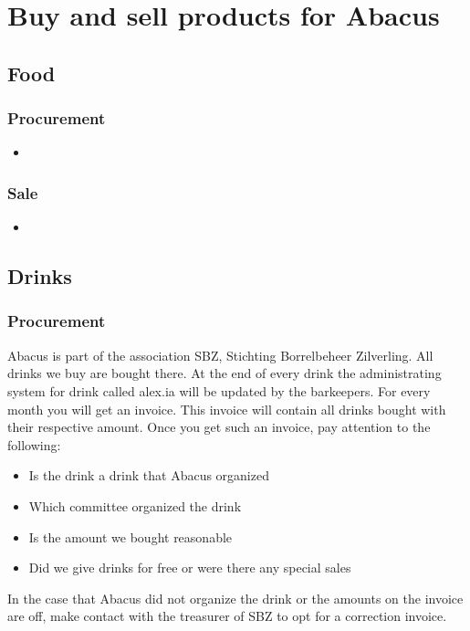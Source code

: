 \documentclass{report}
\begin{document}
\section{Buy and sell products for Abacus}

\subsection{Food}

\subsubsection{Procurement}
\begin{itemize} 
\vspace{-1mm}
\itemsep-1mm 
\item 
\end{itemize}

\subsubsection{Sale}
\begin{itemize}
\vspace{-1mm}
\itemsep-1mm 
\item
\end{itemize}

\subsection{Drinks}
\subsubsection{Procurement}
Abacus is part of the association SBZ, Stichting Borrelbeheer Zilverling. All drinks we buy are bought there. At the end of every drink the administrating system for drink called alex.ia will be updated by the barkeepers. For every month you will get an invoice. This invoice will contain all drinks bought with their respective amount. Once you get such an invoice, pay attention to the following:  
\begin{itemize} 
\vspace{-1mm}
\itemsep-1mm 
\item Is the drink a drink that Abacus organized
\item Which committee organized the drink
\item Is the amount we bought reasonable
\item Did we give drinks for free or were there any special sales
\end{itemize}
In the case that Abacus did not organize the drink or the amounts on the invoice are off, make contact with the treasurer of SBZ to opt for a correction invoice.
\end{document}
